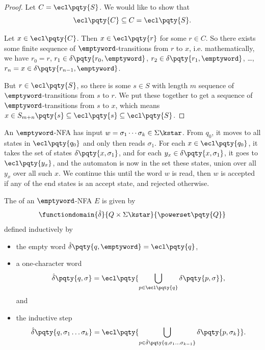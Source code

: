 \begin{proof}
    Let \(C = \ecl\pqty{S}\). We would like to show that
    \[
        \ecl\pqty{C} \subseteq C = \ecl\pqty{S}.
    \]

    Let \(x \in \ecl\pqty{C}\). Then \(x \in \ecl\pqty{r}\) for some \(r \in C\). So there exists some finite sequence of \(\emptyword\)-transitions from \(r\) to \(x\), i.e. mathematically, we have \(r_0 = r\), \(r_1 \in \delta\pqty{r_0, \emptyword}\), \(r_2 \in \delta\pqty{r_1, \emptyword}\), \dots, \(r_n = x \in \delta\pqty{r_{n - 1}, \emptyword}\).

    But \(r \in \ecl\pqty{S}\), so there is some \(s \in S\) with length \(m\) sequence of \(\emptyword\)-transitions from \(s\) to \(r\). We put these together to get a sequence of \(\emptyword\)-transitions from \(s\) to \(x\), which means \(x \in S_{m + n} \pqty{s} \subseteq \ecl\pqty{s} \subseteq \ecl\pqty{S}\).
\end{proof}

An \(\emptyword\)-NFA has input \(w = \sigma_1 \cdots \sigma_k \in \Sigma\kstar\). From \(q_0\), it moves to all states in \(\ecl\pqty{q_0}\) and only then reads \(\sigma_1\). For each \(x \in \ecl\pqty{q_0}\), it takes the set of states \(\delta\pqty{x, \sigma_1}\), and for each \(y_x \in \delta\pqty{x, \sigma_1}\), it goes to \(\ecl\pqty{y_x}\), and the automaton is now in the set these states, union over all \(y_x\) over all such \(x\). We continue this until the word \(w\) is read, then \(w\) is accepted if any of the end states is an accept state, and rejected otherwise.

\begin{definition}
    The  of an \(\emptyword\)-NFA \(E\) is given by
    \[
        \functiondomain{\hat{\delta}}{Q \times \Sigma\kstar}{\powerset\pqty{Q}}
    \]
    defined inductively by
    \begin{itemize}
        \item the empty word \(\hat{\delta} \pqty{q, \emptyword} = \ecl\pqty{q}\),
        \item a one-character word
        \[
            \hat{\delta} \pqty{q, \sigma} = \ecl\pqty{\bigcup_{p \in \ecl\pqty{q}} \delta\pqty{p, \sigma}},
        \]
        and
        \item the inductive step
        \[
            \hat{\delta} \pqty{q, \sigma_1 \ldots \sigma_k} = \ecl\pqty{\bigcup_{p \in \hat{\delta}\pqty{q, \sigma_1 \ldots \sigma_{k - 1}}} \delta\pqty{p, \sigma_k}}.
        \]
    \end{itemize}
\end{definition}

